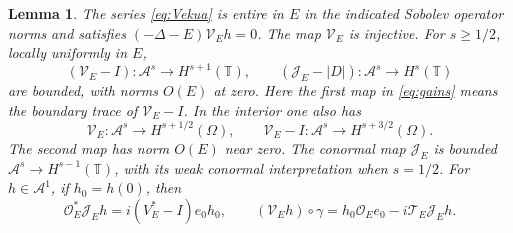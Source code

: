 \documentclass[11pt]{amsart}
\numberwithin{equation}{section}
\newtheorem{lemma}{Lemma}[section]
\newcommand{\T}{\mathbb T}
\newcommand{\OO}{\mathcal O}
\newcommand{\TT}{\mathcal T}
\newcommand{\JJ}{\mathcal J}
\newcommand{\VV}{\mathcal V}
\begin{document}
\begin{lemma}\label{lem:transmutation}
The series \eqref{eq:Vekua} is entire in $E$ in the indicated Sobolev
operator norms and satisfies $(-\Delta-E)\VV_Eh=0$. The map $\VV_E$ is
injective. For $s\ge1/2$, locally uniformly in $E$,
\begin{equation}\label{eq:gains}
 (\VV_E-I):\mathscr A^s\longrightarrow H^{s+1}(\T),
 \qquad (\JJ_E-|D|):\mathscr A^s\longrightarrow H^s(\T)
\end{equation}
are bounded, with norms $O(E)$ at zero. Here the first map in
\eqref{eq:gains} means the boundary trace of $\VV_E-I$.
In the interior one also has
\begin{equation}\label{eq:interior-transmutation}
 \VV_E:\mathscr A^s\longrightarrow H^{s+1/2}(\Omega),\qquad
 \VV_E-I:\mathscr A^s\longrightarrow H^{s+3/2}(\Omega).
\end{equation}
The second map has norm $O(E)$ near zero. The conormal map $\JJ_E$
is bounded $\mathscr A^s\to H^{s-1}(\T)$, with its weak conormal
interpretation when $s=1/2$.
For $h\in\mathscr A^1$, if $h_0=h(0)$, then
\begin{equation}\label{eq:anti-endpoint}
 \OO_E^*\JJ_Eh=i(V_E^*-I)e_0h_0,
 \qquad (\VV_Eh)\circ\gamma=h_0\OO_Ee_0-i\TT_E\JJ_Eh.
\end{equation}
\end{lemma}
\end{document}
